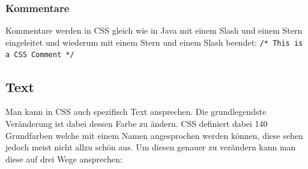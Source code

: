\documentclass{article}
\begin{document}
	\subsubsection{Kommentare}
	Kommentare werden in CSS gleich wie in Java mit einem Slash und einem Stern eingeleitet und wiederum mit einem Stern und einem Slash beendet: \texttt{/* This is a CSS Comment */}
	\subsection{Text}
	Man kann in CSS auch spezifisch Text ansprechen. Die grundlegendste Veränderung ist dabei dessen Farbe zu ändern. CSS definiert dabei 140 Grundfarben welche mit einem Namen angesprochen werden können, diese sehen jedoch meist nicht allzu schön aus. Um diesen genauer zu verändern kann man diese auf drei Wege ansprechen:
\end{document}
